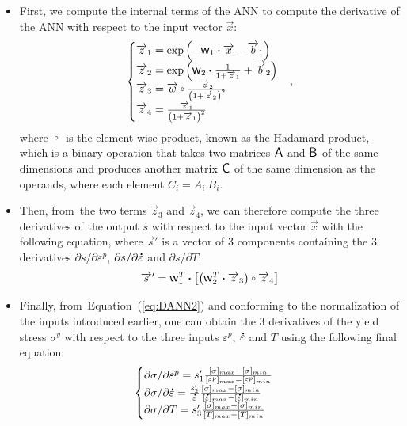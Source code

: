 \documentclass[algorithms,article,accept,pdftex,oneauthors]{Definitions/mdpi}
\DeclareRobustCommand{\w}{\mbox{\large\ensuremath{\mathsf{w}}}}
\DeclareRobustCommand{\A}{\mbox{\large\ensuremath{\mathsf{A}}}}
\DeclareRobustCommand{\B}{\mbox{\large\ensuremath{\mathsf{B}}}}
\DeclareRobustCommand{\C}{\mbox{\large\ensuremath{\mathsf{C}}}}
\DeclareRobustCommand{\dotp}{\boldsymbol{\cdot}}
\DeclareRobustCommand{\ccirc}{\kern0.5ex\vcenter{\hbox{$\scriptstyle\circ$}}\kern0.5ex}
\DeclareRobustCommand{\mdot}[1]{\accentset{\mbox{\bfseries .}}{#1}}
\begin{document}
\begin{itemize}
\item First, we compute the internal terms of the ANN to compute the derivative of the ANN with respect to the input vector $\overrightarrow{x}$:
\begin{equation}
\begin{cases}
\overrightarrow{z}_1 = \exp{\left(- \w_1 \dotp \overrightarrow{x}- \overrightarrow{b}_1\right)}\\
\overrightarrow{z}_2 = \exp{\left(\w_2 \dotp \frac{1}{1+\overrightarrow{z}_1} + \overrightarrow{b}_2\right)}\\
\overrightarrow{z}_3 = \overrightarrow{w} \ccirc \frac{ \overrightarrow{z}_2}{\left(1 + \overrightarrow{z}_2\right)^2}\\
\overrightarrow{z}_4 = \frac{\overrightarrow{z}_1}{\left(1+\overrightarrow{z}_1\right)^2}
\end{cases},
\label{eq:DANN1}
\end{equation}
where $\ccirc$ is the element-wise product, known as the Hadamard product, which is a binary operation that takes two matrices $\A$ and $\B$ of the same dimensions and produces another matrix $\C$ of the same dimension as the operands, where each element $C_i=A_i~B_i$.
\item Then, from~the two terms $\overrightarrow{z}_3$ and $\overrightarrow{z}_4$, we can therefore compute the three derivatives of the output $s$ with respect to the input vector $\overrightarrow{x}$ with the following equation, where $\overrightarrow{s}'$ is a vector of $3$ components containing the $3$ derivatives $\partial s/\partial\varepsilon^p$, $\partial s/\partial\mdot\varepsilon$ and $\partial s/\partial T$:
\begin{equation}
\overrightarrow{s}' = \w_1^T \dotp \left[\left(\w_2^T \dotp \overrightarrow{z}_3 \right) \ccirc \overrightarrow{z}_4\right]\label{eq:DANN2}
\end{equation}

\item Finally, from~Equation~(\ref{eq:DANN2}) and conforming to the normalization of the inputs introduced earlier, one can obtain the $3$ derivatives of the yield stress $\sigma^y$ with respect to the three inputs $\varepsilon^p$, $\mdot\varepsilon$ and $T$ using the following final equation:
\begin{equation}
\begin{cases}
\partial \sigma/\partial \varepsilon^p = s'_1 \frac{[\sigma]_{max} -[\sigma]_{min}}{[\varepsilon^p]_{max} -[\varepsilon^p]_{min}}\\
\partial \sigma/\partial\mdot\varepsilon = \frac{s'_2}{\mdot\varepsilon} \frac{[\sigma]_{max} -[\sigma]_{min}}{[\mdot\varepsilon]_{max} -[\mdot\varepsilon]_{min}} \\
\partial \sigma/\partial T = s'_3 \frac{[\sigma]_{max} -[\sigma]_{min}}{[T]_{max} -[T]_{min}}
\end{cases}
\label{eq:DANN3}
\end{equation}
\end{itemize}
\end{document}
